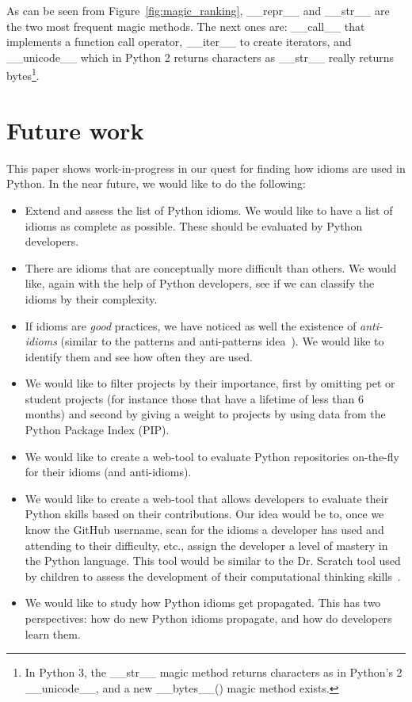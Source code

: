 \documentclass[conference]{IEEEtran}
\begin{document}
As can be seen from Figure~\ref{fig:magic_ranking}, \_\_repr\_\_ and \_\_str\_\_ are the two most frequent magic methods. The next ones are: \_\_call\_\_ that implements a function call operator, \_\_iter\_\_ to create iterators, and \_\_unicode\_\_ which in Python 2 returns characters as \_\_str\_\_ really returns bytes\footnote{In Python 3, the \_\_str\_\_ magic method returns characters as in Python's 2 \_\_unicode\_\_, and a new \_\_bytes\_\_() magic method exists.}.


\section{Future work}

This paper shows work-in-progress in our quest for finding how idioms are used in Python. In the near future, we would like to do the following:

\begin{itemize}

  \item Extend and assess the list of Python idioms. We would like to have a list of idioms as complete as possible. These should be evaluated by Python developers.
  
  \item There are idioms that are conceptually more difficult than others. We would like, again with the help of Python developers, see if we can classify the idioms by their complexity.
  
  \item If idioms are \emph{good} practices, we have noticed as well the existence of \emph{anti-idioms} (similar to the patterns and anti-patterns idea~\cite{brown1998antipatterns}). We would like to identify them and see how often they are used.
  
  \item We would like to filter projects by their importance, first by omitting pet or student projects (for instance those that have a lifetime of less than 6 months) and second by giving a weight to projects by using data from the Python Package Index (PIP).

  \item We would like to create a web-tool to evaluate Python repositories on-the-fly for their idioms (and anti-idioms).
  
  \item We would like to create a web-tool that allows developers to evaluate their Python skills based on their contributions. Our idea would be to, once we know the GitHub username, scan for the idioms a developer has used and attending to their difficulty, etc., assign the developer a level of mastery in the Python language. This tool would be similar to the Dr. Scratch tool used by children to assess the development of their computational thinking skills~\cite{el2015dr}.
  
  \item We would like to study how Python idioms get propagated. This has two perspectives: how do new Python idioms propagate, and how do developers learn them.

\end{itemize}
\end{document}
